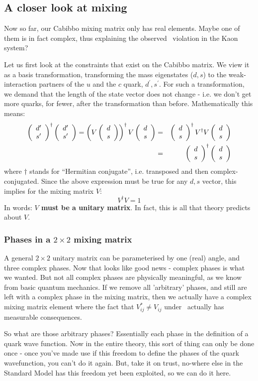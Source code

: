 \subsection{A closer look at mixing}
 Now so far, our Cabibbo mixing matrix only has real elements. Maybe
 one of them is in fact complex, thus explaining the observed \cp\
 violation in the Kaon system?

 Let us first look at the constraints that exist on the Cabibbo
 matrix. We view it as a basis transformation, transforming the mass
 eigenstates ($d,s$) to the weak-interaction partners of the $u$ and
 the $c$ quark, $d^{\prime}, s^{\prime}$. For such a
 transformation, we demand that the length of the state vector does
 not change - i.e. we don't get more quarks, for fewer, after the
 transformation than before.
 Mathematically this means:
\begin{eqnarray}
  \left( \begin{array}{c} d^{\prime} \\ s^{\prime} \end{array} \right)^{\dagger}
  \left( \begin{array}{c} d^{\prime} \\ s^{\prime} \end{array} \right)
=
 \left( V  \left( \begin{array}{c} d \\ s \end{array} \right)\right)^{\dagger}
  V  \left( \begin{array}{c} d \\ s \end{array} \right)
&=&
  \left( \begin{array}{c} d \\ s \end{array} \right)^{\dagger}
 V^{\dagger} V
  \left( \begin{array}{c} d \\ s \end{array} \right)
\nonumber\\
&=&
  \left( \begin{array}{c} d \\ s \end{array} \right)^{\dagger}
  \left( \begin{array}{c} d \\ s \end{array} \right)
\end{eqnarray}
 where $\dagger$ stands for ``Hermitian conjugate'', i.e. transposed
 and then complex-conjugated.  Since the above expression must be true
 for any $d,s$ vector, this implies for the mixing matrix $V$:
\begin{equation}
 V^{\dagger} V = 1
\end{equation}
 In words: \textbf{$V$ must be a unitary matrix}. In fact, this is all
 that theory predicts about $V$.

\subsubsection{Phases in a $2\times 2$ mixing matrix}
 A general $2\times2$ unitary matrix can be parameterised by one
 (real) angle, and three complex phases. Now that looks like good news
 - complex phases is what we wanted. But not all complex phases are
 physically meaningful, as we know from basic quantum mechanics. If we
 remove all 'arbitrary' phases, and still are left with a complex
 phase in the mixing matrix, then we actually have a complex mixing
 matrix element where the fact that $V_{ij}^* \neq V_{ij}$ under \cp\
 actually has measurable consequences.

 So what are those arbitrary phases? Essentially each phase in the
 definition of a quark wave function. Now in the entire theory, this
 sort of thing can only be done once - once you've made use if this
 freedom to define the phases of the quark wavefunction, you can't do
 it again. But, take it on trust, no-where else in the Standard Model
 has this freedom yet been exploited, so we can do it here.

